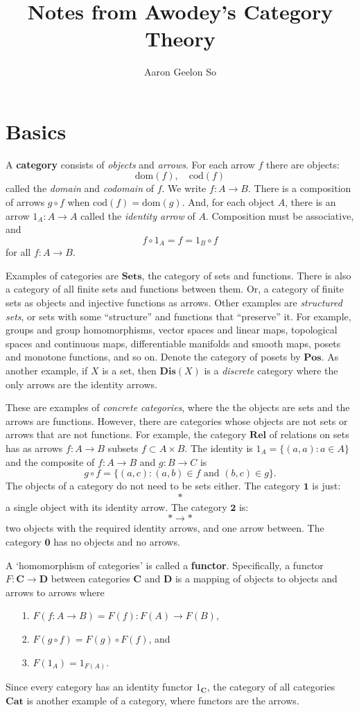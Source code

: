 \documentclass[reqno]{amsart}
\title{Notes from Awodey's Category Theory}
\author{Aaron Geelon So}
\date{}
\providecommand{\dom}{\mathrm{dom}}
\providecommand{\cod}{\mathrm{cod}}
\providecommand{\Sets}{\mathbf{Sets}}
\providecommand{\Pos}{\mathbf{Pos}}
\providecommand{\One}{\mathbf{1}}
\providecommand{\Cat}{\mathbf{Cat}}
\begin{document}
\maketitle

\section{Basics}
A \textbf{category} consists of \emph{objects} and \emph{arrows}. For each arrow $f$ there are objects:
\[\dom(f),\quad \cod(f)\]
called the \emph{domain} and \emph{codomain} of $f$. We write $f:A \to B$. There is a composition of arrows $g \circ f$ when $\cod(f) = \dom(g)$. And, for each object $A$, there is an arrow $1_A: A\to A$ called the \emph{identity arrow} of $A$. Composition must be associative, and
\[f \circ 1_A = f = 1_B \circ f\]
for all $f: A \to B$.

Examples of categories are $\Sets$, the category of sets and functions. There is also a category of all finite sets and functions between them. Or, a category of finite sets as objects and injective functions as arrows. Other examples are \emph{structured sets}, or sets with some ``structure'' and functions that ``preserve'' it. For example, groups and group homomorphisms, vector spaces and linear maps, topological spaces and continuous maps, differentiable manifolds and smooth maps, posets and monotone functions, and so on. Denote the category of posets by $\Pos$. As another example, if $X$ is a set, then $\mathbf{Dis}(X)$ is a \emph{discrete} category where the only arrows are the identity arrows.

These are examples of \emph{concrete categories}, where the the objects are sets and the arrows are functions. However, there are categories whose objects are not sets or arrows that are not functions. For example, the category $\mathbf{Rel}$ of relations on sets has as arrows $f: A \to B$ subsets $f \subset A\times B$. The identity is $1_A = \{(a,a) : a \in A\}$ and the composite of $f: A\to B$ and $g: B \to C$ is
\[g \circ f = \{(a,c): (a,b) \in f \textrm{ and } (b,c) \in g\}.\]
The objects of a category do not need to be sets either. The category $\One$ is just:
\[*\]
a single object with its identity arrow. The category $\mathbf{2}$ is:
\[* \longrightarrow *\]
two objects with the required identity arrows, and one arrow between. The category $\mathbf{0}$ has no objects and no arrows. 

A `homomorphism of categories' is called a \textbf{functor}. Specifically, a functor $F: \mathbf{C} \to \mathbf{D}$ between categories $\mathbf{C}$ and $\mathbf{D}$ is a mapping of objects to objects and arrows to arrows where 
\begin{enumerate}
\item[1.] $F(f: A \to B) = F(f): F(A) \to F(B)$,
\item[2.] $F(g \circ f) = F(g) \circ F(f)$, and
\item[3.] $F(1_A) = 1_{F(A)}$.
\end{enumerate}
Since every category has an identity functor $1_\mathbf{C}$, the category of all categories $\Cat$ is another example of a category, where functors are the arrows.
\end{document}
